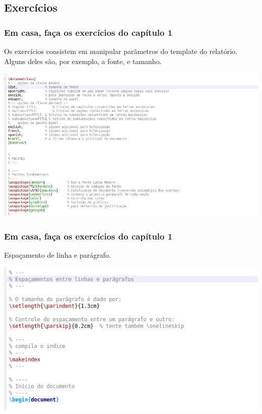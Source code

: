 \documentclass{beamer}
\begin{document}
\begin{frame}

  \section{Exercícios}
  \frametitle{Em casa, faça os exercícios do capítulo 1}

  Os exercícios consistem em manipular parâmetros do template do
  relatório. Alguns deles são, por exemplo, a fonte, e tamanho.

  \begin{center}
    \includegraphics[scale=0.30] {../Imagens/ST4.png}
  \end{center}

  \end{frame}

  \begin{frame}

  \frametitle{Em casa, faça os exercícios do capítulo 1}

  Espaçamento de linha e parágrafo.

   \begin{center}
    \includegraphics[scale=0.40] {../Imagens/ST5.png}
  \end{center}


\end{frame}
\end{document}
